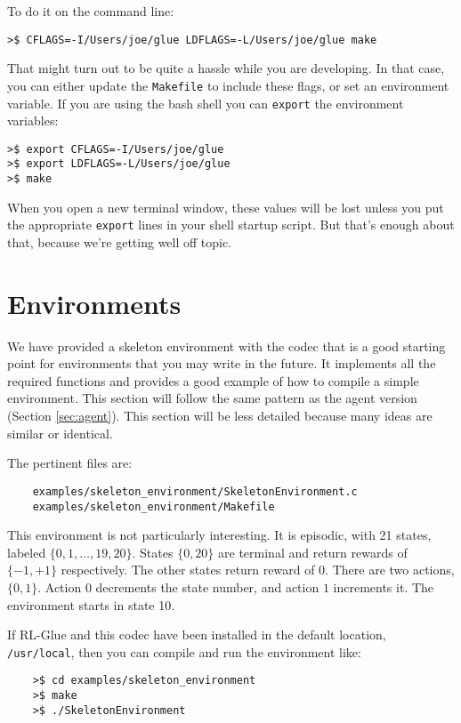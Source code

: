 \documentclass[11pt]{article}
\begin{document}
To do it on the command line:
\begin{verbatim}
>$ CFLAGS=-I/Users/joe/glue LDFLAGS=-L/Users/joe/glue make
\end{verbatim}

That might turn out to be quite a hassle while you are developing.  In that case, you can either update the \texttt{Makefile} to include these flags, 
or set an environment variable.  If you are using the bash shell you can \texttt{export} the environment variables:
\begin{verbatim}
>$ export CFLAGS=-I/Users/joe/glue
>$ export LDFLAGS=-L/Users/joe/glue
>$ make
\end{verbatim}

When you open a new terminal window, these values will be lost unless you put the appropriate \texttt{export} lines in your shell startup script.  But that's enough about that, because
we're getting well off topic.

\section{Environments}
We have provided a skeleton environment with the codec that is a good starting point for environments that you may write in the future.
It implements all the required functions and provides a good example of how to compile a simple environment.  This section will follow the same 
pattern as the agent version (Section \ref{sec:agent}).  This section will be less detailed because many ideas are similar or identical.

The pertinent files are:
\begin{verbatim}
	examples/skeleton_environment/SkeletonEnvironment.c
	examples/skeleton_environment/Makefile
\end{verbatim}

This environment is not particularly interesting. It is episodic, with 21 states, labeled $\{0, 1,\ldots,19,20\}$. States $\{0, 20\}$ are terminal and return rewards of $\{-1, +1\}$ respectively.  The other states return reward of $0$.
There are two actions, $\{0, 1\}$.  Action $0$ decrements the state number, and action $1$ increments it. The environment starts in state 10.

If RL-Glue and this codec have been installed in the default location, \texttt{/usr/local}, then you can compile and run the environment like:
\begin{verbatim}
	>$ cd examples/skeleton_environment
	>$ make
	>$ ./SkeletonEnvironment
\end{verbatim}
\end{document}
